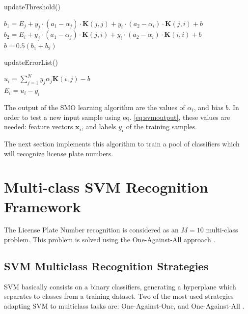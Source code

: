 \documentclass{ipol}
\def\x{{\mathbf x}}
\def\K{{\mathbf K}}
\begin{document}
\begin{algorithm}[!htbp]
\small
\caption{updateThreshold()}
\DontPrintSemicolon
{}
$b_1 = E_j + y_j \cdot (a_1 - \alpha_j) \cdot \K(j,j) + y_i \cdot (a_2 - \alpha_i) \cdot \K(j,i) + b$\\
$b_2 = E_i + y_j \cdot (a_1 - \alpha_j) \cdot \K(j,i) + y_i \cdot (a_2 - \alpha_i) \cdot \K(i,i) + b$\\
$b = 0.5 (b_1+b_2)$ \\
\label{alg:updateThreshold}
\end{algorithm}


\begin{algorithm}[!htbp]
\small
\caption{updateErrorList()}
\DontPrintSemicolon
\Input{}
 {
	$u_i = \sum_{j=1}^N y_j \alpha_j \K(i,j) - b$ \\
	$E_i = u_i - y_i$ \\
}
\label{alg:updateErrorList}
\end{algorithm}

The output of the SMO learning algorithm are the values of $\alpha_i$, and bias $b$.
In order to test a new input sample using eq. \ref{eq:svmoutput}, these values are needed: feature vectors $\x_i$, and labels $y_i$ of the training samples.

The next section implements this algorithm to train a pool of classifiers which will recognize license plate numbers.

\section{Multi-class SVM Recognition Framework}

The License Plate Number recognition is considered as an $M=10$ multi-class problem.
This problem is solved using the One-Against-All approach \cite{Rifkin:2004,Liu:2005}.
\subsection{SVM Multiclass Recognition Strategies}

SVM basically consists on a binary classifiers, generating a hyperplane which separates to classes from a training dataset.
Two of the most used strategies adapting SVM to multiclass tasks are: One-Against-One, and One-Against-All \cite{Milgram:2006,Gidudu:2007}.
\end{document}
